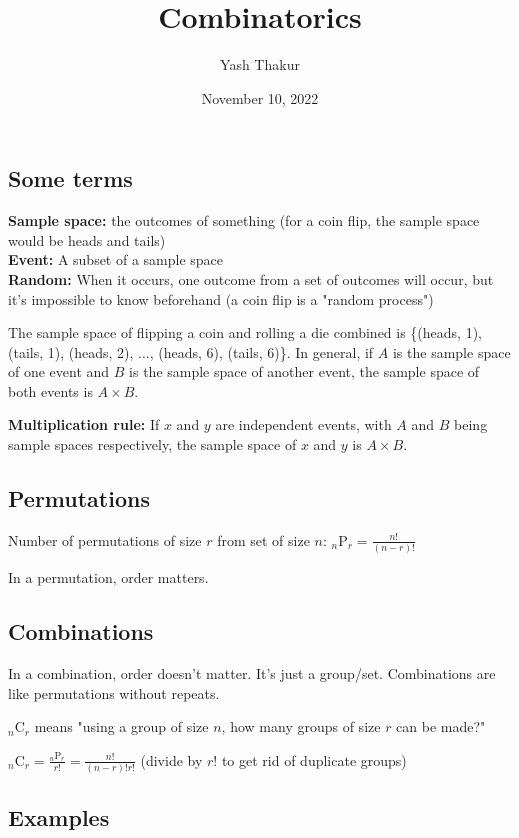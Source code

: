 \documentclass[12pt, leqno]{article}
\title{Combinatorics}
\author{Yash Thakur}
\date{November 10, 2022}
\newcommand{\perm}[2]{{}_{#1}\mathrm{P}_{#2}}
\newcommand{\comb}[2]{{}_{#1}\mathrm{C}_{#2}}
\begin{document}

\maketitle

\subsection*{Some terms}

\textbf{Sample space:} the outcomes of something (for a coin flip, the sample space would be heads and tails)\\
\textbf{Event:} A subset of a sample space\\
\textbf{Random:} When it occurs, one outcome from a set of outcomes will occur, but it's impossible to know beforehand (a coin flip is a "random process")

The sample space of flipping a coin and rolling a die combined is \{(heads, 1), (tails, 1), (heads, 2), ..., (heads, 6), (tails, 6)\}. In general, if $A$ is the sample space of one event and $B$ is the sample space of another event, the sample space of both events is $A \times B$.

\textbf{Multiplication rule:} If $x$ and $y$ are independent events, with $A$ and $B$ being sample spaces respectively, the sample space of $x$ and $y$ is $A \times B$.

\subsection*{Permutations}

Number of permutations of size $r$ from set of size $n$: $\perm{n}{r} = \frac{n!}{(n - r)!}$

In a permutation, order matters.

\subsection*{Combinations}

In a combination, order doesn't matter. It's just a group/set. Combinations are like permutations without repeats.

$\comb{n}{r}$ means "using a group of size $n$, how many groups of size $r$ can be made?"

$\displaystyle \comb{n}{r} = \frac{\perm{n}{r}}{r!} = \frac{n!}{(n-r)!r!}$ (divide by $r!$ to get rid of duplicate groups)

\subsection*{Examples}
\end{document}
